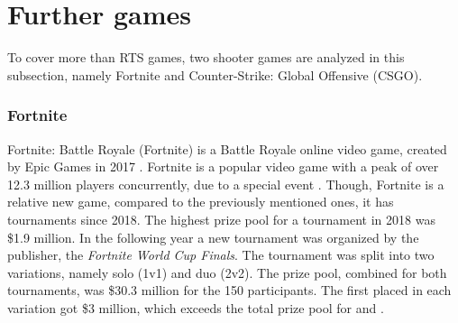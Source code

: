 \section{Further games}
To cover more than RTS games, two shooter games are analyzed in this subsection, namely Fortnite and Counter-Strike: Global Offensive (CSGO). 

\subsubsection{Fortnite}
Fortnite: Battle Royale (Fortnite) is a Battle Royale online video game, created by Epic Games in 2017 \cite{EpicGame39:online}. Fortnite is a popular video game with a peak of over 12.3 million players concurrently, due to a special event \cite{FortniteTweet}. Though, Fortnite is a relative new game, compared to the previously mentioned ones, it has tournaments since 2018. The highest prize pool for a tournament in 2018 was \$1.9 million. In the following year a new tournament was organized by the publisher, the \textit{Fortnite World Cup Finals}. The tournament was split into two variations, namely solo (1v1) and duo (2v2). The prize pool, combined for both tournaments, was \$30.3 million for the 150 participants. The first placed in each variation got \$3 million, which exceeds the total prize pool for  and .

